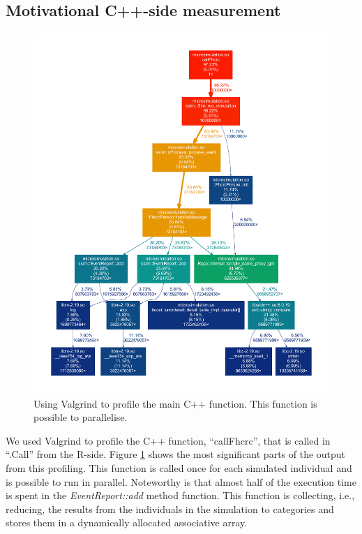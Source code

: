 \subsection{Motivational C++-side measurement}
\begin{figure}[!htbp] \centering
  \includegraphics[height=0.70\textheight]{images/simpleMotivatingValgrind.pdf}
  \caption{Using Valgrind to profile the main C++ function. This
    function is possible to parallelise.}
  \label{fig:cppMot}
\end{figure}
We used Valgrind to profile the C++ function, ``callFhcrc'', that is
called in ``.Call'' from the R-side. Figure \ref{fig:cppMot} shows the
most significant parts of the output from this profiling. This
function is called once for each simulated individual and is possible
to run in parallel. Noteworthy is that almost half of the execution
time is spent in the \emph{EventReport::add} method function. This
function is collecting, i.e., reducing, the results from the
individuals in the simulation to categories and stores them in a
dynamically allocated associative array.

